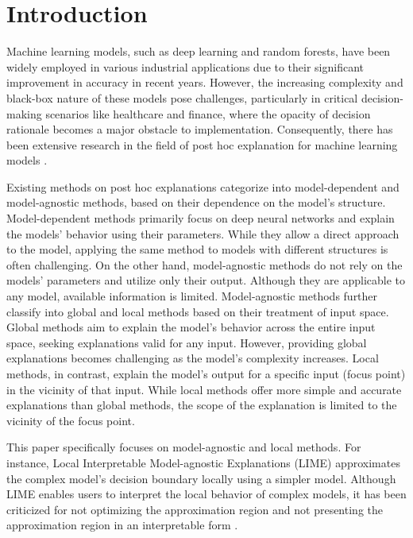 \documentclass[runningheads]{llncs}
\begin{document}
\section{Introduction}
Machine learning models, such as deep learning and random forests,
have been widely employed in various industrial applications
due to their significant improvement in accuracy in recent years.
However,
the increasing complexity and black-box nature of these models pose challenges,
particularly in critical decision-making scenarios like healthcare and finance,
where the opacity of decision rationale becomes a major obstacle to
implementation.
Consequently,
there has been extensive research in the field of post hoc explanation
for machine learning models \cite{%
  ribeiro2016why,ribeiro2018anchors,radulovic2023bella,guidotti2018local}.

Existing methods on post hoc explanations categorize into model-dependent and
model-agnostic methods,
based on their dependence on the model's structure.
Model-dependent methods primarily focus on deep neural networks and
explain the models' behavior using their parameters.
While they allow a direct approach to the model,
applying the same method to models with different structures is often challenging.
On the other hand,
model-agnostic methods do not rely on the models' parameters and utilize only their output.
Although they are applicable to any model, available information is limited.
Model-agnostic methods further classify into global and local methods
based on their treatment of input space.
Global methods aim to explain the model's behavior across the entire input space,
seeking explanations valid for any input.
However, providing global explanations becomes challenging as the model's complexity increases.
Local methods, in contrast, explain the model's output for a specific input
(focus point) in the vicinity of that input.
While local methods offer more simple and accurate explanations than global methods,
the scope of the explanation is limited to the vicinity of the focus point.

This paper specifically focuses on model-agnostic and local methods. For instance, Local Interpretable Model-agnostic Explanations (LIME) \cite{ribeiro2016why} approximates the complex model's decision boundary locally using a simpler model. Although LIME enables users to interpret the local behavior of complex models, it has been criticized for not optimizing the approximation region \cite{radulovic2023bella} and not presenting the approximation region in an interpretable form \cite{ribeiro2018anchors}.
\end{document}
